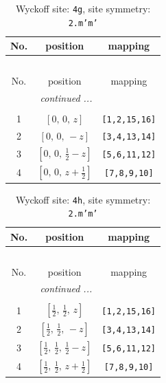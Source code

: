 \documentclass[fleqn,8pt]{jsarticle}
\begin{document}
\renewcommand{\arraystretch}{1.2}
\begin{longtable}{ccc}
\caption{Wyckoff site: {\tt 4g}, site symmetry: {\tt 2.m'm'}}
 \\
 \hline \hline
No. & position & mapping \\ \hline \endfirsthead

\multicolumn{2}{l}{\tablename\ \thetable{}} \\
 \hline \hline
No. & position & mapping \\ \hline \endhead

 \hline \hline
\multicolumn{2}{r}{\footnotesize\it continued ...} \\ \endfoot

 \hline \hline
\multicolumn{2}{r}{} \\ \endlastfoot

1 & $\left[ 0,\, 0,\, z \right]$ & {\tt [1,2,15,16]} \\ \hline
2 & $\left[ 0,\, 0,\, - z \right]$ & {\tt [3,4,13,14]} \\ \hline
3 & $\left[ 0,\, 0,\, \frac{1}{2} - z \right]$ & {\tt [5,6,11,12]} \\ \hline
4 & $\left[ 0,\, 0,\, z + \frac{1}{2} \right]$ & {\tt [7,8,9,10]} \\
\end{longtable}
\renewcommand{\arraystretch}{1.2}
\begin{longtable}{ccc}
\caption{Wyckoff site: {\tt 4h}, site symmetry: {\tt 2.m'm'}}
 \\
 \hline \hline
No. & position & mapping \\ \hline \endfirsthead

\multicolumn{2}{l}{\tablename\ \thetable{}} \\
 \hline \hline
No. & position & mapping \\ \hline \endhead

 \hline \hline
\multicolumn{2}{r}{\footnotesize\it continued ...} \\ \endfoot

 \hline \hline
\multicolumn{2}{r}{} \\ \endlastfoot

1 & $\left[ \frac{1}{2},\, \frac{1}{2},\, z \right]$ & {\tt [1,2,15,16]} \\ \hline
2 & $\left[ \frac{1}{2},\, \frac{1}{2},\, - z \right]$ & {\tt [3,4,13,14]} \\ \hline
3 & $\left[ \frac{1}{2},\, \frac{1}{2},\, \frac{1}{2} - z \right]$ & {\tt [5,6,11,12]} \\ \hline
4 & $\left[ \frac{1}{2},\, \frac{1}{2},\, z + \frac{1}{2} \right]$ & {\tt [7,8,9,10]} \\
\end{longtable}
\end{document}
